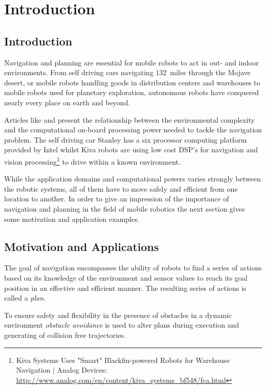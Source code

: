 \chapter{Introduction}\label{ch:introduction}
\section{Introduction}
Navigation and planning are essential for mobile robots to act in out- and indoor environments. 
From self driving cars navigating 132~miles through the Mojave desert, or mobile robots handling goods in distribution centers and warehouses to mobile robots used for planetary exploration, autonomous robots have conquered nearly every place on earth and beyond.
 
Articles like \cite{stanley} and \cite{kiva} present the relationship between the environmental complexity and the computational on-board processing power needed to tackle the navigation problem.
The self driving car Stanley has a six processor computing platform provided by Intel whilst Kiva robots are using low cost DSP's for navigation and vision processing\footnote{Kiva Systems Uses "Smart" Blackfin-powered Robots for Warehouse Navigation | Analog Devices: \url{http://www.analog.com/en/content/kiva_systems_bf548/fca.html}} to drive within a known environment.  

While the application domains and computational powers varies strongly between the robotic systems, all of them have to move safely and efficient from one location to another.   
In order to give an impression of the importance of navigation and planning in the field of mobile robotics the next section gives some motivation and application examples.

\section{Motivation and Applications}\label{sec:motivation} 
The goal of navigation encompasses the ability of robots to find a series of actions based on its knowledge of the environment and sensor values to reach its goal position in an effective and efficient manner.
The resulting series of actions is called a \emph{plan}. 

To ensure safety and flexibility in the presence of obstacles in a dynamic environment \emph{obstacle avoidance} is used to alter plans during execution and generating of collision free trajectories.

